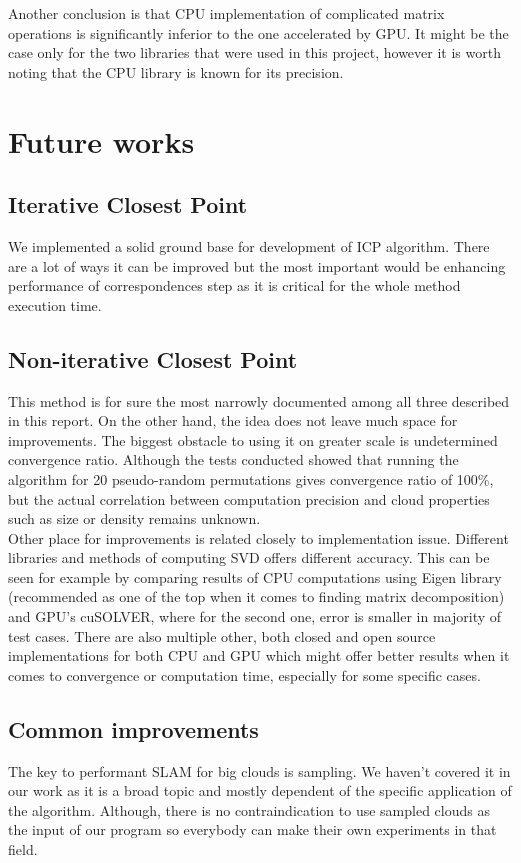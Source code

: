 \documentclass[titlepage]{article}
\begin{document}
Another conclusion is that CPU implementation of complicated matrix operations is significantly inferior to the one accelerated by GPU. It might be the case only for the two libraries that were used in this project, however it is worth noting that the CPU library is known for its precision.

\section{Future works}

\subsection{Iterative Closest Point}
We implemented a solid ground base for development of ICP algorithm. There are a lot of ways it can be improved but the most important would be enhancing performance of correspondences step as it is critical for the whole method execution time. 

\subsection{Non-iterative Closest Point}
This method is for sure the most narrowly documented among all three described in this report. On the other hand, the idea does not leave much space for improvements. The biggest obstacle to using it on greater scale is undetermined convergence ratio. Although the tests conducted showed that running the algorithm for 20 pseudo-random permutations gives convergence ratio of 100\%, but the actual correlation between computation precision and cloud properties such as size or density remains unknown.\\
Other place for improvements is related closely to implementation issue. Different libraries and methods of computing SVD offers different accuracy. This can be seen for example by comparing results of CPU computations using Eigen library (recommended as one of the top when it comes to finding matrix decomposition) and GPU's cuSOLVER, where for the second one, error is smaller in majority of test cases. There are also multiple other, both closed and open source implementations for both CPU and GPU which might offer better results when it comes to convergence or computation time, especially for some specific cases.

\subsection{Common improvements}
The key to performant SLAM for big clouds is sampling. We haven't covered it in our work as it is a broad topic and mostly dependent of the specific application of the algorithm. Although, there is no contraindication to use sampled clouds as the input of our program so everybody can make their own experiments in that field.

\newpage
\printbibliography
\end{document}

